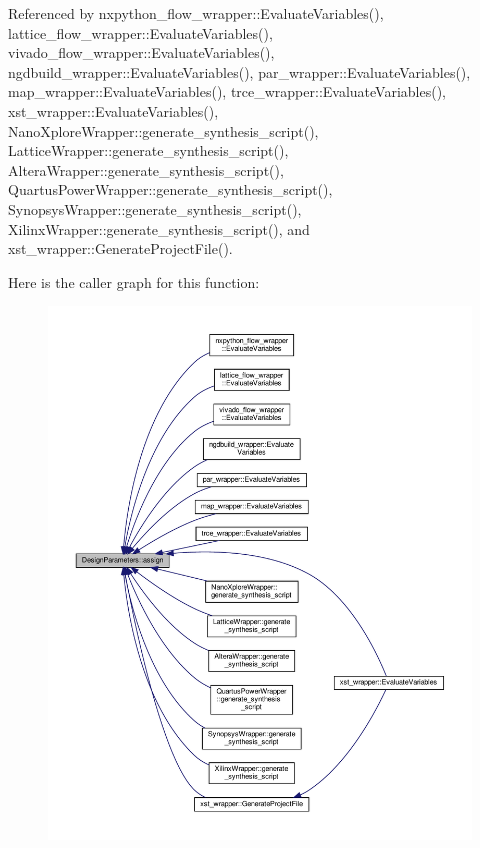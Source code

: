 Referenced by nxpython\+\_\+flow\+\_\+wrapper\+::\+Evaluate\+Variables(), lattice\+\_\+flow\+\_\+wrapper\+::\+Evaluate\+Variables(), vivado\+\_\+flow\+\_\+wrapper\+::\+Evaluate\+Variables(), ngdbuild\+\_\+wrapper\+::\+Evaluate\+Variables(), par\+\_\+wrapper\+::\+Evaluate\+Variables(), map\+\_\+wrapper\+::\+Evaluate\+Variables(), trce\+\_\+wrapper\+::\+Evaluate\+Variables(), xst\+\_\+wrapper\+::\+Evaluate\+Variables(), Nano\+Xplore\+Wrapper\+::generate\+\_\+synthesis\+\_\+script(), Lattice\+Wrapper\+::generate\+\_\+synthesis\+\_\+script(), Altera\+Wrapper\+::generate\+\_\+synthesis\+\_\+script(), Quartus\+Power\+Wrapper\+::generate\+\_\+synthesis\+\_\+script(), Synopsys\+Wrapper\+::generate\+\_\+synthesis\+\_\+script(), Xilinx\+Wrapper\+::generate\+\_\+synthesis\+\_\+script(), and xst\+\_\+wrapper\+::\+Generate\+Project\+File().

Here is the caller graph for this function\+:
\nopagebreak
\begin{figure}[H]
\begin{center}
\leavevmode
\includegraphics[width=350pt]{d7/d62/structDesignParameters_ae60622dce36883cf97d3a644268aa685_icgraph}
\end{center}
\end{figure}
\mbox{\label{structDesignParameters_a908a02002e611884c4b7af3a742460c8}} 
